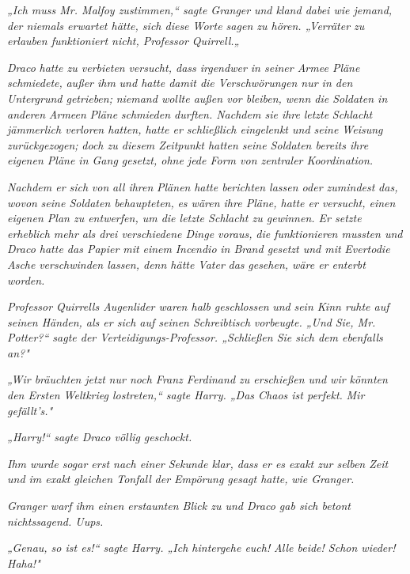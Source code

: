 {\emph{„Ich muss Mr. Malfoy zustimmen,“ sagte Granger} \emph{und kland dabei wie jemand, der niemals erwartet hätte, sich diese Worte sagen zu hören. „Verräter zu erlauben funktioniert nicht, Professor Quirrell.„}

\emph{Draco} \emph{hatte zu verbieten} \emph{versucht, dass irgendwer in seiner Armee Pläne schmiedete,} \emph{außer ihm} \emph{und hatte damit die Verschwörungen nur in den Untergrund getrieben;} \emph{niemand wollte außen vor bleiben, wenn die Soldaten in} \emph{\emph{anderen}} \emph{Armeen} \emph{Pläne} \emph{schmieden durften. Nachdem sie ihre} \emph{letzte} \emph{Schlacht jämmerlich verloren hatten, hatte er schließlich eingelenkt und seine Weisung zurückgezogen;} \emph{doch zu diesem Zeitpunkt hatten seine Soldaten bereits ihre eigenen Pläne in Gang gesetzt, ohne jede Form von zentraler Koordination.}

\emph{Nachdem er sich} \emph{von} \emph{all ihren} \emph{Plänen} \emph{hatte berichten lassen oder zumindest} \emph{das,} \emph{wovon} \emph{seine Soldaten behaupteten,} \emph{es wären ihre Pläne, hatte er versucht, einen eigenen Plan zu entwerfen, um die letzte Schlacht zu gewinnen. Er setzte erheblich mehr als drei verschiedene Dinge voraus,} \emph{die funktionieren mussten und Draco hatte das Papier mit} \emph{einem} \emph{\emph{Incendio}} \emph{in Brand gesetzt und mit} \emph{\emph{Everto}die Asche} \emph{verschwinden lassen, denn hätte Vater} \emph{das} \emph{gesehen, wäre er enterbt worden.}

\emph{Professor Quirrells Augenlider waren halb geschlossen} \emph{und} \emph{sein Kinn ruhte auf seinen Händen, als er sich auf seinen Schreibtisch} \emph{vorbeugte. „Und} \emph{Sie, Mr. Potter?“ sagte der Verteidigungs-Professor. „Schließen Sie sich dem ebenfalls an?"}

\emph{„Wir bräuchten} \emph{jetzt} \emph{nur noch Franz Ferdinand zu erschießen und wir könnten den Ersten Weltkrieg lostreten,“ sagte Harry. „Das Chaos ist perfekt.} \emph{Mir gefällt's."}

\emph{„\emph{Harry!}“ sagte Draco völlig} \emph{geschockt.}

\emph{Ihm wurde sogar erst nach einer Sekunde klar, dass er es exakt zur selben Zeit und im exakt gleichen Tonfall} \emph{der Empörung gesagt hatte,} \emph{wie Granger.}

\emph{Granger warf ihm einen erstaunten Blick zu und Draco gab sich betont} \emph{nichtssagend. Uups.}

\emph{„Genau, so ist es!“ sagte Harry. „Ich hintergehe euch!} \emph{Alle beide! Schon wieder! Haha!"}

}
